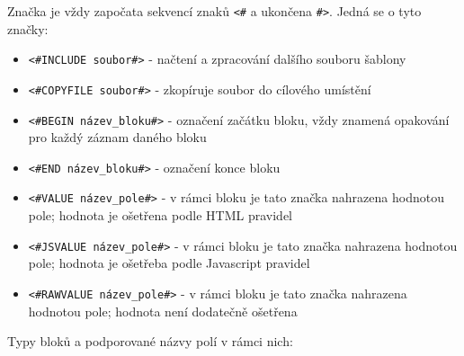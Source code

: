 \documentclass[czech,BP]{thesiskiv}
\begin{document}
Značka je vždy započata sekvencí znaků \texttt{<\#} a ukončena \texttt{\#>}. Jedná se o tyto značky:

\begin{itemize}
\item \texttt{<\#INCLUDE soubor\#>} - načtení a zpracování dalšího souboru šablony
\item \texttt{<\#COPYFILE soubor\#>} - zkopíruje soubor do cílového umístění
\item \texttt{<\#BEGIN název\_bloku\#>} - označení začátku bloku, vždy znamená opakování pro každý záznam daného bloku
\item \texttt{<\#END název\_bloku\#>} - označení konce bloku
\item \texttt{<\#VALUE název\_pole\#>} - v rámci bloku je tato značka nahrazena hodnotou pole; hodnota je ošetřena podle HTML pravidel
\item \texttt{<\#JSVALUE název\_pole\#>} - v rámci bloku je tato značka nahrazena hodnotou pole; hodnota je ošetřeba podle Javascript pravidel
\item \texttt{<\#RAWVALUE název\_pole\#>} - v rámci bloku je tato značka nahrazena hodnotou pole; hodnota není dodatečně ošetřena
\end{itemize}

Typy bloků a podporované názvy polí v rámci nich:

\renewcommand{\labelitemii}{$\bullet$}
\end{document}

